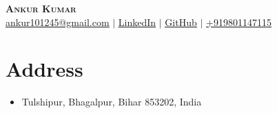 \documentclass[letterpaper,11pt]{article}
\makeatletter
\newcommand{\resumeItem}[1]{
  \item\small{
    {#1 \vspace{-2pt}}
  }
}
\newcommand{\resumeSubheading}[4]{
  \vspace{-2pt}\item
    \begin{tabular*}{0.97\textwidth}[t]{l@{\extracolsep{\fill}}r}
      \textbf{#1} & #2 \\
      \textit{\small#3} & \textit{\small #4} \\
    \end{tabular*}\vspace{-7pt}
}
\newcommand{\resumeSubSubheading}[2]{
    \item
    \begin{tabular*}{0.97\textwidth}{l@{\extracolsep{\fill}}r}
      \textit{\small#1} & \textit{\small #2} \\
    \end{tabular*}\vspace{-7pt}
}
\newcommand{\resumeSubHeadingListStart}{\begin{itemize}[leftmargin=0.15in, label={}]}
\newcommand{\resumeSubHeadingListEnd}{\end{itemize}}
\newcommand{\resumeItemListStart}{\begin{itemize}}
\newcommand{\resumeItemListEnd}{\end{itemize}\vspace{-5pt}}
\makeatother
\begin{document}

\begin{center}
    \textbf{\Huge \scshape Ankur Kumar} \\ \vspace{2pt}
    \href{mailto:ankur101245@gmail.com}{ \underline{ankur101245@gmail.com}} $|$  
    \href{https://linkedin.com/in/ankurkr05}{ \underline{LinkedIn}} $|$
    \href{https://github.com/akj-07}{ \underline{GitHub}} $|$
    \href{tel:+919801147115} { \underline{+919801147115}}
\end{center}

\section{Address}
\begin{itemize}[leftmargin=0.15in, label={}]
    \item \small Tulshipur, Bhagalpur, Bihar 853202, India
\end{itemize}

        
    
       
\end{document}
